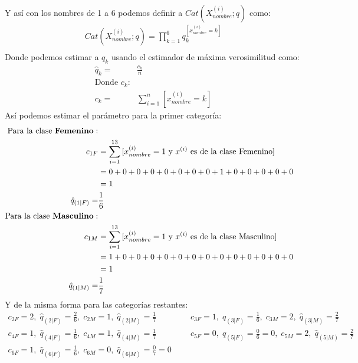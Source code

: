 \documentclass[12pt]{article}
\begin{document}
  \paragraph{}Y así con los nombres de 1 a 6 podemos definir a $Cat(X_{nombre}^{(i)};q)$ como:\\
  \begin{equation}
  \begin{split}
  Cat(X_{nombre}^{(i)};q) = \prod_{k=1}^{6}q_{k}^{[x_{nombre}^{(i)}=k ]}\\
  \end{split}
  \end{equation}
  Donde podemos estimar a $q_k$ usando el estimador de máxima verosimilitud como:
  \begin{equation}
  \begin{split}
  \hat{q}_k =& \frac{c_k}{n} \\ 
  \text{Donde $c_k$:}&\\
  c_k =& \sum_{i = 1}^{n}{[x^{(i)}_{nombre}=k]}
  \end{split}
  \end{equation}
  Así podemos estimar el parámetro para la primer categoría:\\
  \begin{equation}
  \begin{split}
  	\text{Para la clase \textbf{Femenino}}:\\
  	c_{1F} &= \sum_{i = 1}^{13}{[x^{(i)}_{nombre}=1 \text{ y $x^{(i)}$ es de la clase Femenino}]}\\
  	&= 0 + 0 + 0 + 0 + 0 + 0 + 0 + 0 + 1 + 0 + 0 + 0 + 0 + 0\\
  	&= 1\\
  \hat{q}_{(1|F)} =& \frac{1}{6} \\ 
  \text{Para la clase \textbf{Masculino}}:\\
  c_{1M} &= \sum_{i = 1}^{13}{[x^{(i)}_{nombre}=1 \text{ y $x^{(i)}$ es de la clase Masculino}]}\\
  &= 1 + 0 + 0 + 0 + 0 + 0 + 0 + 0 + 0 + 0 + 0 + 0 + 0 + 0\\
  &= 1\\
  \hat{q}_{(1|M)} =& \frac{1}{7} \\
  \end{split}
  \end{equation}
  Y de la misma forma para las categorías restantes:
  \begin{equation}
  \begin{split}
  c_{2F} = 2, \; \hat{q}_{(2|F)} = \frac{2}{6}, \; c_{2M} = 1, \; \hat{q}_{(2|M)} = \frac{1}{7} \; \; \; \; \; \; \; \; \; \; \; \; &  c_{3F} = 1, \; \hat{q}_{(3|F)} = \frac{1}{6}, \; c_{3M} = 2, \; \hat{q}_{(3|M)} = \frac{2}{7}\\
  c_{4F} = 1, \; \hat{q}_{(4|F)} = \frac{1}{6}, \; c_{4M} = 1, \; \hat{q}_{(4|M)} = \frac{1}{7} \; \; \; \; \; \; \; \; \; \; \; \; &  c_{5F} = 0, \; \hat{q}_{(5|F)} = \frac{0}{6} = 0, \; c_{5M} = 2, \; \hat{q}_{(5|M)} = \frac{2}{7}\\ 
  c_{6F} = 1, \; \hat{q}_{(6|F)} = \frac{1}{6}, \;c_{6M} = 0, \; \hat{q}_{(6|M)} = \frac{0}{7} = 0\\
  \end{split}
  \end{equation}
\end{document}
